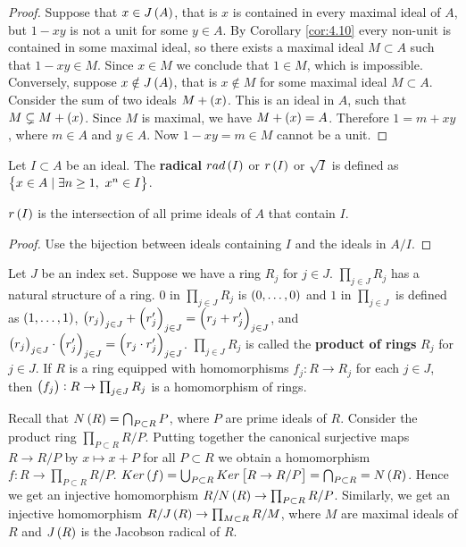 \begin{proof}
Suppose that $ x \in J\br{A} $, that is $ x $ is contained in every maximal ideal of $ A $, but $ 1 - xy $ is not a unit for some $ y \in A $. By Corollary \ref{cor:4.10} every non-unit is contained in some maximal ideal, so there exists a maximal ideal $ M \subset A $ such that $ 1 - xy \in M $. Since $ x \in M $ we conclude that $ 1 \in M $, which is impossible. Conversely, suppose $ x \notin J\br{A} $, that is $ x \notin M $ for some maximal ideal $ M \subset A $. Consider the sum of two ideals $ M + \br{x} $. This is an ideal in $ A $, such that $ M \subsetneq M + \br{x} $. Since $ M $ is maximal, we have $ M + \br{x} = A $. Therefore $ 1 = m + xy $, where $ m \in A $ and $ y \in A $. Now $ 1 - xy = m \in M $ cannot be a unit.
\end{proof}

Let $ I \subset A $ be an ideal. The \textbf{radical} $ rad\br{I} $ or $ r\br{I} $ or $ \sqrt{I} $ is defined as $ \cbr{x \in A \mid \exists n \ge 1, \ x^n \in I} $.

\begin{proposition}
$ r\br{I} $ is the intersection of all prime ideals of $ A $ that contain $ I $.
\end{proposition}

\begin{proof}
Use the bijection between ideals containing $ I $ and the ideals in $ A / I $.
\end{proof}


\begin{definition}
Let $ J $ be an index set. Suppose we have a ring $ R_j $ for $ j \in J $. $ \prod_{j \in J} R_j $ has a natural structure of a ring. $ 0 $ in $ \prod_{j \in J} R_j $ is $ \br{0, \dots, 0} $ and $ 1 $ in $ \prod_{j \in J} $ is defined as $ \br{1, \dots, 1} $, $ \br{r_j}_{j \in J} + \br{r'_j}_{j \in J} = \br{r_j + r'_j}_{j \in J} $, and $ \br{r_j}_{j \in J} \cdot \br{r'_j}_{j \in J} = \br{r_j \cdot r'_j}_{j \in J} $.
$ \prod_{j \in J} R_j $ is called the \textbf{product of rings} $ R_j $ for $ j \in J $. If $ R $ is a ring equipped with homomorphisms $ f_j : R \to R_j $ for each $ j \in J $, then $ \br{f_j} : R \to \prod_{j \in J} R_j $ is a homomorphism of rings.
\end{definition}

Recall that $ N\br{R} = \bigcap_{P \subset R} P $, where $ P $ are prime ideals of $ R $. Consider the product ring $ \prod_{P \subset R} R / P $. Putting together the canonical surjective maps $ R \to R / P $ by $ x \mapsto x + P $ for all $ P \subset R $ we obtain a homomorphism $ f : R \to \prod_{P \subset R} R / P $. $ Ker\br{f} = \bigcup_{P \subset R} Ker\sbr{R \to R / P} = \bigcap_{P \subset R} = N\br{R} $. Hence we get an injective homomorphism $ R / N\br{R} \to \prod_{P \subset R} R / P $. Similarly, we get an injective homomorphism $ R / J\br{R} \to \prod_{M \subset R} R / M $, where $ M $ are maximal ideals of $ R $ and $ J\br{R} $ is the Jacobson radical of $ R $.

